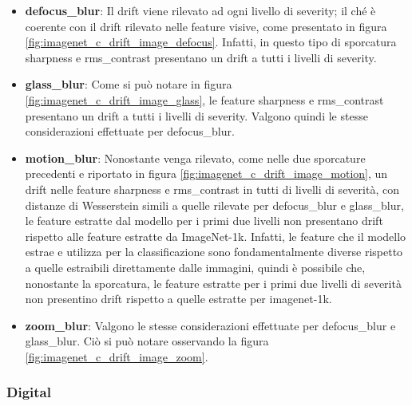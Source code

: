 \begin{itemize}
  \item \textbf{defocus\_blur}: Il drift viene rilevato ad ogni livello di severity; il ché è coerente con il drift rilevato nelle feature visive, come presentato in figura \ref{fig:imagenet_c_drift_image_defocus}. Infatti, in questo tipo di sporcatura sharpness e rms\_contrast presentano un drift a tutti i livelli di severity.
  \item \textbf{glass\_blur}: Come si può notare in figura \ref{fig:imagenet_c_drift_image_glass}, le feature sharpness e rms\_contrast presentano un drift a tutti i livelli di severity. Valgono quindi le stesse considerazioni effettuate per defocus\_blur.
  \item \textbf{motion\_blur}: Nonostante venga rilevato, come nelle due sporcature precedenti e riportato in figura \ref{fig:imagenet_c_drift_image_motion}, un drift nelle feature sharpness e rms\_contrast in tutti di livelli di severità, con distanze di Wesserstein simili a quelle rilevate per defocus\_blur e glass\_blur, le feature estratte dal modello per i primi due livelli non presentano drift rispetto alle feature estratte da ImageNet-1k. Infatti, le feature che il modello estrae e utilizza per la classificazione sono fondamentalmente diverse rispetto a quelle estraibili direttamente dalle immagini, quindi è possibile che, nonostante la sporcatura, le feature estratte per i primi due livelli di severità non presentino drift rispetto a quelle estratte per imagenet-1k.
  \item \textbf{zoom\_blur}: Valgono le stesse considerazioni effettuate per defocus\_blur e glass\_blur. Ciò si può notare osservando la figura \ref{fig:imagenet_c_drift_image_zoom}.
\end{itemize}
\subsubsection{Digital}

